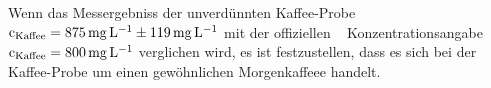 \documentclass{article}
\begin{document}
Wenn das Messergebniss der unverdünnten Kaffee-Probe
$\ce{c_{Kaffee}} = 875 \, \si{\milli\gram\per\liter} \pm 119  \, \si{\milli\gram\per\liter}$
 mit der \glqq offiziellen \grqq ~\cite{koffeincom} Konzentrationsangabe $\ce{c_{Kaffee}} = 800 \, \si{\milli\gram\per\liter}$ verglichen wird,
 es ist festzustellen, dass es sich bei der Kaffee-Probe um einen gewöhnlichen Morgenkaffeee handelt.


\printbibliography
\end{document}
